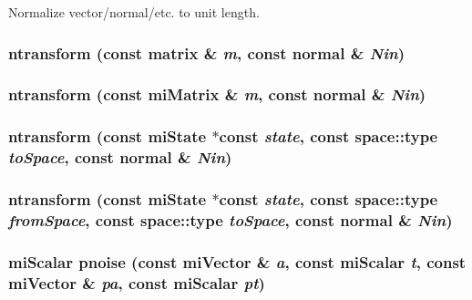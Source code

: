 Normalize vector/normal/etc. to unit length. 

\subsubsection{ ntransform (const matrix \& {\em m}, const normal \& {\em Nin})\hspace{0.3cm}{\tt  [inline]}}\label{namespacersl_a141}


\subsubsection{ ntransform (const mi\-Matrix \& {\em m}, const normal \& {\em Nin})\hspace{0.3cm}{\tt  [inline]}}\label{namespacersl_a140}


\subsubsection{ ntransform (const mi\-State $\ast$const {\em state}, const space::type {\em to\-Space}, const normal \& {\em Nin})\hspace{0.3cm}{\tt  [inline]}}\label{namespacersl_a139}


\subsubsection{ ntransform (const mi\-State $\ast$const {\em state}, const space::type {\em from\-Space}, const space::type {\em to\-Space}, const normal \& {\em Nin})\hspace{0.3cm}{\tt  [inline]}}\label{namespacersl_a138}


\subsubsection{\setlength{\rightskip}{0pt plus 5cm}mi\-Scalar pnoise (const mi\-Vector \& {\em a}, const mi\-Scalar {\em t}, const mi\-Vector \& {\em pa}, const mi\-Scalar {\em pt})\hspace{0.3cm}{\tt  [inline]}}\label{namespacersl_a104}


